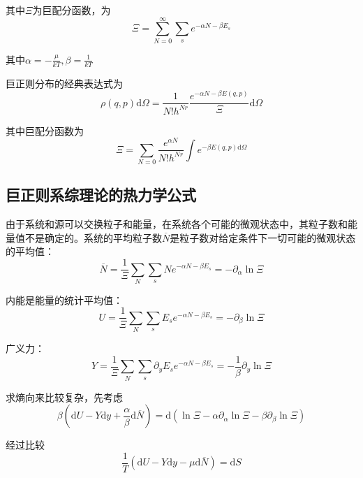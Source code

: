 \documentclass[UTF8]{ctexart}
\newcommand{\dif}{\mathrm{d}}
\begin{document}
\noindent 其中$ \Xi $为巨配分函数，为
\begin{equation}
	\Xi=\sum_{N=0}^{\infty} \sum_{s} e^{-\alpha N-\beta E_{s}}
\end{equation}

\noindent 其中$ \alpha=-\frac{\mu}{kT}, \beta=\frac{1}{kT} $

	巨正则分布的经典表达式为
	\begin{equation}
		\rho(q, p) \dif \Omega=\frac{1}{N ! h^{N r}} \frac{e^{-\alpha N-\beta E(q, p)}}{\Xi} \dif \Omega
	\end{equation}
	
\noindent 其中巨配分函数为
\begin{equation}
	\Xi= \sum_{N=0} \frac{e^{\alpha N}}{N ! h^{Nr}} \int e^{-\beta E(q,p) \dif \Omega}
\end{equation}

	\subsection{巨正则系综理论的热力学公式}
	由于系统和源可以交换粒子和能量，在系统各个可能的微观状态中，其粒子数和能量值不是确定的。系统的平均粒子数$ \overline{N} $是粒子数对给定条件下一切可能的微观状态的平均值：
	\begin{equation}
	\overline{N}=\frac{1}{\Xi} \sum_{N} \sum_{s} N e^{-\alpha N-\beta E_{s}}=-\partial_{\alpha} \ln \Xi
	\end{equation}
	
\noindent 内能是能量的统计平均值：
\begin{equation}
U=\frac{1}{\Xi} \sum_{N} \sum_{s} E_{s} e^{-\alpha N-\beta E_{s}}=-\partial_{\beta} \ln \Xi
\end{equation}

\noindent 广义力：
\begin{equation}
Y=\frac{1}{\Xi} \sum_{N} \sum_{s} \partial_{y} E_{s} e^{-\alpha N-\beta E_{s}}=-\frac{1}{\beta} \partial_{y} \ln \Xi
\end{equation}

\noindent 求熵向来比较复杂，先考虑
\begin{equation}
\beta\left(\dif U-Y \dif y+\frac{\alpha}{\beta} \dif \overline{N}\right)=\dif \left(\ln \Xi-\alpha \partial_{\alpha} \ln \Xi-\beta \partial_{\beta} \ln \Xi\right)
\end{equation}

\noindent 经过比较
\begin{equation}
\frac{1}{T}(\dif U-Y \dif y-\mu \dif \overline{N})=\dif S
\end{equation}
\end{document}
